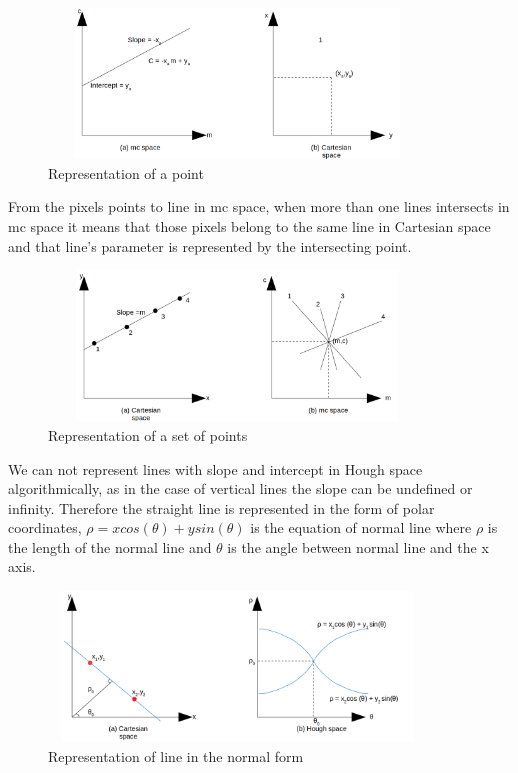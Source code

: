                     \begin{figure}[h]
    \centering
    \includegraphics[width=10cm, height =4cm]{images/hough2.png}
    \caption{Representation of a point}
    \end{figure}
    
    From the pixels points to line in mc space, when more than one lines intersects in mc space it means that those pixels belong to the same line in Cartesian space and that line's parameter is represented by the intersecting point. 
    
                 \begin{figure}[h]
    \centering
    \includegraphics[width=10cm, height =4cm]{images/hough3.png}
    \caption{Representation of a set of points}
    \end{figure}
    
    We can not represent lines with slope and intercept in Hough space algorithmically, as in the case of vertical lines the slope can be undefined or infinity. Therefore the straight line is represented in the form of polar coordinates, $\rho = xcos(\theta) + ysin(\theta) $ is the equation of normal line where $\rho$ is the length of the normal line and $\theta$ is the angle between normal line and the x axis. 
    
    \begin{figure}[h]
    \centering
    \includegraphics[width=10cm, height =4cm]{images/hough4.png}
    \caption{Representation of line in the normal form}
    \end{figure}
    
